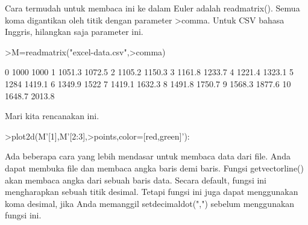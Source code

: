 \documentclass[12pt,Times new roman,letterpaper]{book}
\begin{document}
\begin{eulernootebook}
\begin{eulercomment}
\begin{eulercomment}
\begin{eulernootebook}
\begin{eulercomment}
\begin{eulercomment}
\begin{eulercomment}
\begin{eulercomment}
\begin{eulercomment}
\begin{eulercomment}
\begin{eulercomment}
\begin{eulercomment}
\begin{eulercomment}
\begin{eulercomment}
\begin{eulercomment}
\begin{eulercomment}
\begin{eulercomment}
\begin{eulercomment}
Cara termudah untuk membaca ini ke dalam Euler adalah readmatrix().
Semua koma digantikan oleh titik dengan parameter \textgreater{}comma. Untuk CSV
bahasa Inggris, hilangkan saja parameter ini.
\end{eulercomment}
\begin{eulerprompt}
>M=readmatrix("excel-data.csv",>comma)
\end{eulerprompt}
\begin{euleroutput}
          0      1000      1000 
          1    1051.3    1072.5 
          2    1105.2    1150.3 
          3    1161.8    1233.7 
          4    1221.4    1323.1 
          5      1284    1419.1 
          6    1349.9      1522 
          7    1419.1    1632.3 
          8    1491.8    1750.7 
          9    1568.3    1877.6 
         10    1648.7    2013.8 
\end{euleroutput}
\begin{eulercomment}
Mari kita rencanakan ini.
\end{eulercomment}
\begin{eulerprompt}
>plot2d(M'[1],M'[2:3],>points,color=[red,green]'):
\end{eulerprompt}
\begin{eulercomment}
Ada beberapa cara yang lebih mendasar untuk membaca data dari file.
Anda dapat membuka file dan membaca angka baris demi baris. Fungsi
getvectorline() akan membaca angka dari sebuah baris data. Secara
default, fungsi ini mengharapkan sebuah titik desimal. Tetapi fungsi
ini juga dapat menggunakan koma desimal, jika Anda memanggil
setdecimaldot(",") sebelum menggunakan fungsi ini.


\end{eulercomment}
\end{eulercomment}
\end{eulercomment}
\end{eulercomment}
\end{eulercomment}
\end{eulercomment}
\end{eulercomment}
\end{eulercomment}
\end{eulercomment}
\end{eulercomment}
\end{eulercomment}
\end{eulercomment}
\end{eulercomment}
\end{eulercomment}
\end{eulernootebook}
\end{eulercomment}
\end{eulercomment}
\end{eulernootebook}
\end{document}
